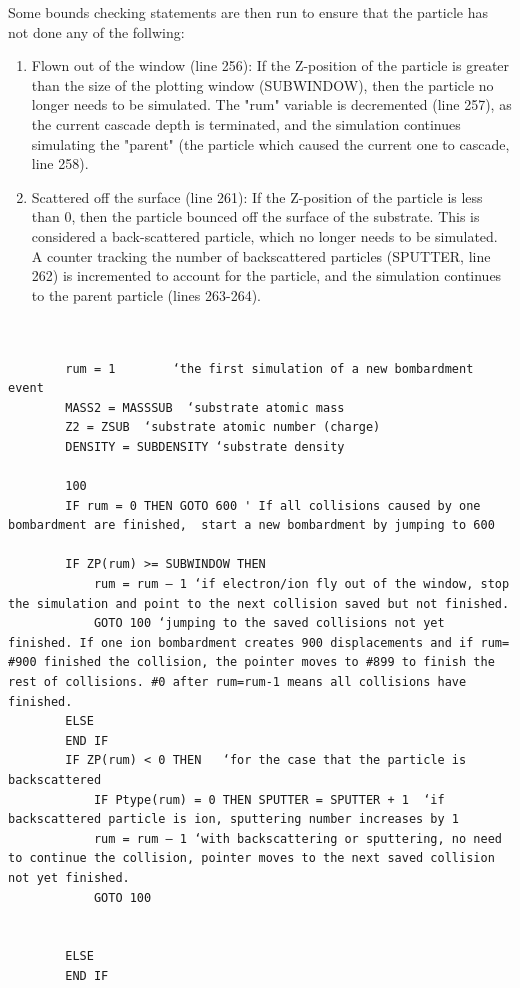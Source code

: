 \documentclass[10pt, reqno]{exam}
\begin{document}
Some bounds checking statements are then run to ensure that the particle has not done any of the follwing: \par

\begin{enumerate}
    \item Flown out of the window (line 256): If the Z-position of the particle is greater than the size of the plotting window (SUBWINDOW), then the particle no longer needs to be simulated. The "rum" variable is decremented (line 257), as the current cascade depth is terminated, and the simulation continues simulating the "parent" (the particle which caused the current one to cascade, line 258).
    \item Scattered off the surface (line 261): If the Z-position of the particle is less than 0, then the particle bounced off the surface of the substrate. This is considered a back-scattered particle, which no longer needs to be simulated. A counter tracking the number of backscattered particles (SPUTTER, line 262) is incremented to account for the particle, and the simulation continues to the parent particle (lines 263-264).
\end{enumerate}

\begin{verbatim}
    

        rum = 1        ‘the first simulation of a new bombardment event 
        MASS2 = MASSSUB  ‘substrate atomic mass
        Z2 = ZSUB  ‘substrate atomic number (charge)
        DENSITY = SUBDENSITY ‘substrate density
    
        100
        IF rum = 0 THEN GOTO 600 ' If all collisions caused by one bombardment are finished,  start a new bombardment by jumping to 600
    
        IF ZP(rum) >= SUBWINDOW THEN 
            rum = rum – 1 ‘if electron/ion fly out of the window, stop the simulation and point to the next collision saved but not finished. 
            GOTO 100 ‘jumping to the saved collisions not yet finished. If one ion bombardment creates 900 displacements and if rum= #900 finished the collision, the pointer moves to #899 to finish the rest of collisions. #0 after rum=rum-1 means all collisions have finished. 
        ELSE
        END IF
        IF ZP(rum) < 0 THEN   ‘for the case that the particle is backscattered
            IF Ptype(rum) = 0 THEN SPUTTER = SPUTTER + 1  ‘if backscattered particle is ion, sputtering number increases by 1
            rum = rum – 1 ‘with backscattering or sputtering, no need to continue the collision, pointer moves to the next saved collision not yet finished. 
            GOTO 100
    
    
        ELSE
        END IF
\end{verbatim}
\end{document}
